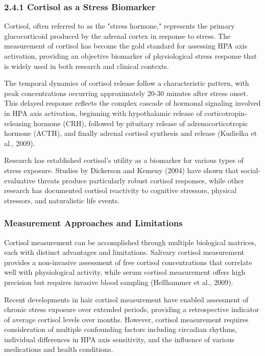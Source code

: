 \documentclass[12pt,a4paper]{article}
\begin{document}
\subsubsection{2.4.1 Cortisol as a Stress Biomarker}

Cortisol, often referred to as the "stress hormone," represents the primary glucocorticoid produced by the adrenal
cortex in response to stress. The measurement of cortisol has become the gold standard for assessing HPA axis
activation, providing an objective biomarker of physiological stress response that is widely used in both research and
clinical contexts.

The temporal dynamics of cortisol release follow a characteristic pattern, with peak concentrations occurring
approximately 20-30 minutes after stress onset. This delayed response reflects the complex cascade of hormonal signaling
involved in HPA axis activation, beginning with hypothalamic release of corticotropin-releasing hormone (CRH), followed
by pituitary release of adrenocorticotropic hormone (ACTH), and finally adrenal cortisol synthesis and release (Kudielka
et al., 2009).

Research has established cortisol's utility as a biomarker for various types of stress exposure. Studies by Dickerson
and Kemeny (2004) have shown that social-evaluative threats produce particularly robust cortisol responses, while other
research has documented cortisol reactivity to cognitive stressors, physical stressors, and naturalistic life events.

\subsubsection{Measurement Approaches and Limitations}

Cortisol measurement can be accomplished through multiple biological matrices, each with distinct advantages and
limitations. Salivary cortisol measurement provides a non-invasive assessment of free cortisol concentrations that
correlate well with physiological activity, while serum cortisol measurement offers high precision but requires invasive
blood sampling (Hellhammer et al., 2009).

Recent developments in hair cortisol measurement have enabled assessment of chronic stress exposure over extended
periods, providing a retrospective indicator of average cortisol levels over months. However, cortisol measurement
requires consideration of multiple confounding factors including circadian rhythms, individual differences in HPA axis
sensitivity, and the influence of various medications and health conditions.
\end{document}
